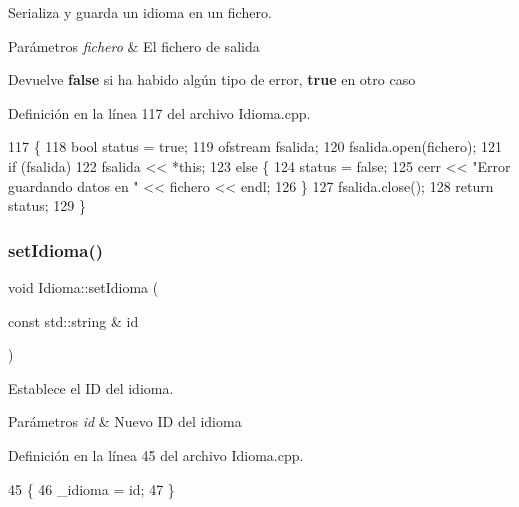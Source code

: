 Serializa y guarda un idioma en un fichero. 


\begin{DoxyParams}{Parámetros}
{\em fichero} & El fichero de salida \\
\hline
\end{DoxyParams}
\begin{DoxyReturn}{Devuelve}
{\bfseries false} si ha habido algún tipo de error, {\bfseries true} en otro caso 
\end{DoxyReturn}


Definición en la línea 117 del archivo Idioma.\+cpp.


\begin{DoxyCode}
117                                                      \{
118     \textcolor{keywordtype}{bool} status = \textcolor{keyword}{true};
119     ofstream fsalida;
120     fsalida.open(fichero);
121     \textcolor{keywordflow}{if} (fsalida)
122         fsalida << *\textcolor{keyword}{this};
123     \textcolor{keywordflow}{else} \{
124         status = \textcolor{keyword}{false};
125         cerr << \textcolor{stringliteral}{"Error guardando datos en "} << fichero << endl;
126     \}
127     fsalida.close();
128     \textcolor{keywordflow}{return} status;
129 \}
\end{DoxyCode}
\mbox{\label{classIdioma_ade18af885e0762821718876f7de496df}} 
\subsubsection{\texorpdfstring{set\+Idioma()}{setIdioma()}}
{\footnotesize\ttfamily void Idioma\+::set\+Idioma (\begin{DoxyParamCaption}\item[{const std\+::string \&}]{id }\end{DoxyParamCaption})}



Establece el ID del idioma. 


\begin{DoxyParams}{Parámetros}
{\em id} & Nuevo ID del idioma \\
\hline
\end{DoxyParams}


Definición en la línea 45 del archivo Idioma.\+cpp.


\begin{DoxyCode}
45                                           \{
46     \_idioma = id;
47 \}
\end{DoxyCode}
\mbox{\label{classIdioma_ae645826d470547ecd8decc4a9498fb55}} 

